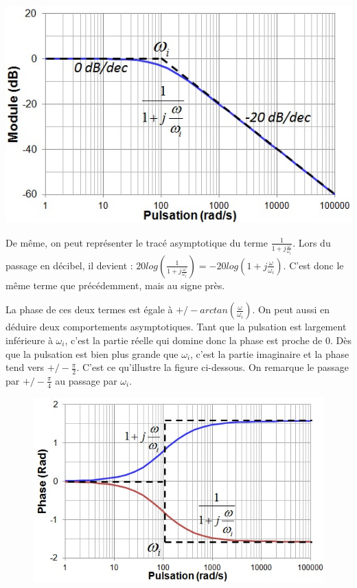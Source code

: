 	\begin{minipage}[l]{0.5\linewidth}
		\includegraphics[scale=0.6]{images/Trace_asympt__1_moins_jw.jpg}
	\end{minipage} \hfill
	\begin{minipage}[c]{0.50\linewidth}
		De même, on peut représenter le tracé asymptotique du terme $\frac{1}{1+j\frac{\omega}{\omega_{i}}}$. Lors du passage en décibel, il devient : $20log(\frac{1}{1+j\frac{\omega}{\omega_{i}}}) = -20log(1+j\frac{\omega}{\omega_{i}})$. C'est donc le même terme que précédemment, mais au signe près. 	
	\end{minipage}
	
	\vspace{0.5\baselineskip}
	
	La phase de ces deux termes est égale à $+/-arctan(\frac{\omega}{\omega_{i}})$. On peut aussi en déduire deux comportements asymptotiques. Tant que la pulsation est largement inférieure à $\omega_{i}$, c'est la partie réelle qui domine donc la phase est proche de 0. Dès que la pulsation est bien plus grande que $\omega_{i}$, c'est la partie imaginaire et la phase tend vers $+/-\frac{\pi}{2}$. C'est ce qu'illustre la figure ci-dessous. On remarque le passage par $+/-\frac{\pi}{4}$ au passage par $\omega_{i}$.
	
	\begin{figure}[h!]
		\centering
		\includegraphics[scale=0.6]{images/Trace_asympt_phase_1_plus_jw.jpg}
	\end{figure}


